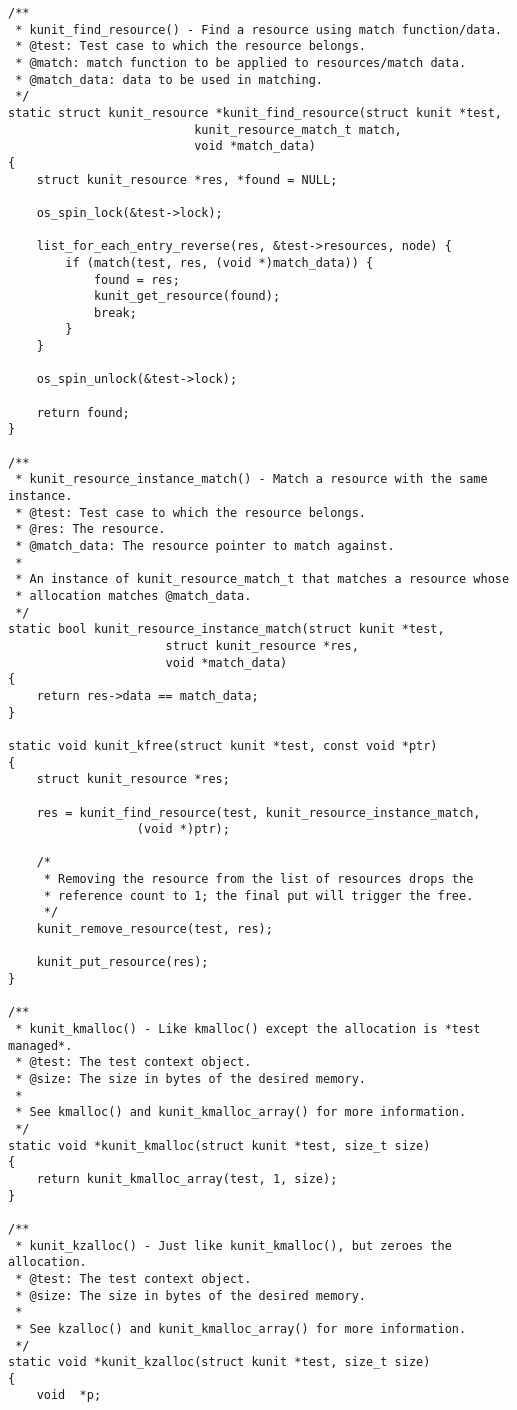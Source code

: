 \documentclass{article}
\begin{document}
\begin{lstlisting}[style=CStyle]
/**
 * kunit_find_resource() - Find a resource using match function/data.
 * @test: Test case to which the resource belongs.
 * @match: match function to be applied to resources/match data.
 * @match_data: data to be used in matching.
 */
static struct kunit_resource *kunit_find_resource(struct kunit *test,
						  kunit_resource_match_t match,
						  void *match_data)
{
	struct kunit_resource *res, *found = NULL;

	os_spin_lock(&test->lock);

	list_for_each_entry_reverse(res, &test->resources, node) {
		if (match(test, res, (void *)match_data)) {
			found = res;
			kunit_get_resource(found);
			break;
		}
	}

	os_spin_unlock(&test->lock);

	return found;
}

/**
 * kunit_resource_instance_match() - Match a resource with the same instance.
 * @test: Test case to which the resource belongs.
 * @res: The resource.
 * @match_data: The resource pointer to match against.
 *
 * An instance of kunit_resource_match_t that matches a resource whose
 * allocation matches @match_data.
 */
static bool kunit_resource_instance_match(struct kunit *test,
					  struct kunit_resource *res,
					  void *match_data)
{
	return res->data == match_data;
}

static void kunit_kfree(struct kunit *test, const void *ptr)
{
	struct kunit_resource *res;

	res = kunit_find_resource(test, kunit_resource_instance_match,
				  (void *)ptr);

	/*
	 * Removing the resource from the list of resources drops the
	 * reference count to 1; the final put will trigger the free.
	 */
	kunit_remove_resource(test, res);

	kunit_put_resource(res);
}

/**
 * kunit_kmalloc() - Like kmalloc() except the allocation is *test managed*.
 * @test: The test context object.
 * @size: The size in bytes of the desired memory.
 *
 * See kmalloc() and kunit_kmalloc_array() for more information.
 */
static void *kunit_kmalloc(struct kunit *test, size_t size)
{
	return kunit_kmalloc_array(test, 1, size);
}

/**
 * kunit_kzalloc() - Just like kunit_kmalloc(), but zeroes the allocation.
 * @test: The test context object.
 * @size: The size in bytes of the desired memory.
 *
 * See kzalloc() and kunit_kmalloc_array() for more information.
 */
static void *kunit_kzalloc(struct kunit *test, size_t size)
{
	void  *p;


\end{lstlisting}
\end{document}
